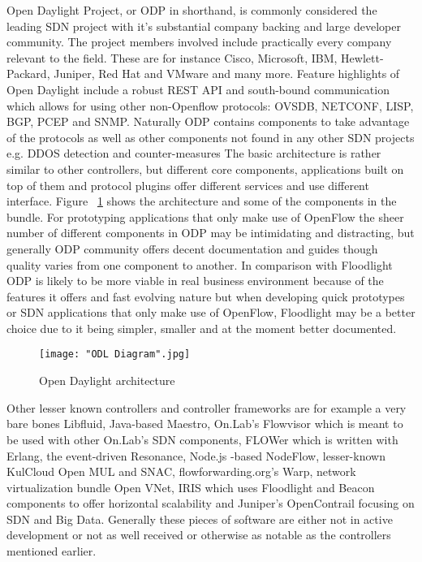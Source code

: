 \documentclass[english]{tktltiki2}
\theoremstyle{definition}
\theoremstyle{remark}
\begin{document}
Open Daylight Project, or ODP in shorthand, is commonly considered the leading SDN project with it’s substantial company backing and large developer community. The project members involved include practically every company relevant to the field. These are for instance Cisco, Microsoft, IBM, Hewlett-Packard, Juniper, Red Hat and VMware and many more. Feature highlights of Open Daylight include  a robust REST API and south-bound communication which allows for using other non-Openflow protocols: OVSDB, NETCONF, LISP, BGP, PCEP and SNMP. Naturally ODP contains components to take advantage of the protocols as well as other components not found in any other SDN projects e.g. DDOS detection and counter-measures The basic architecture is rather similar to other controllers, but different core components, applications built on top of them and protocol plugins offer different services and use different interface. Figure ~\ref{fig:ODL} shows the architecture and some of the components in the bundle. For prototyping applications that only make use of OpenFlow the sheer number of different components in ODP may be intimidating and distracting, but generally ODP community offers decent documentation and guides though quality varies from one component to another. In comparison with Floodlight ODP is likely to be more viable in real business environment because of the features it offers and fast evolving nature but when developing quick prototypes or SDN applications that only make use of OpenFlow, Floodlight may be a better choice due to it being simpler, smaller and at the moment better documented.

\begin{figure}[h!t]
\centering
{}
\texttt{[image: "ODL Diagram".jpg]}
\caption{Open Daylight architecture}
\label{fig:ODL}
\end{figure}

Other lesser known controllers and controller frameworks are for example a very bare bones Libfluid, Java-based Maestro, On.Lab’s Flowvisor which is meant to be used with other On.Lab’s SDN components, FLOWer which is written with Erlang, the event-driven Resonance, Node.js -based NodeFlow, lesser-known KulCloud Open MUL and SNAC, flowforwarding.org’s Warp, network virtualization bundle Open VNet, IRIS which uses Floodlight and Beacon components to offer horizontal scalability and Juniper’s OpenContrail focusing on SDN and Big Data. Generally these pieces of software are either not in active development or not as well received or otherwise as notable as the controllers mentioned earlier.
\end{document}
